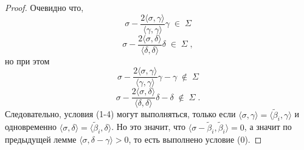\documentclass[10pt]{article}
\theoremstyle{remark}
\begin{document}
\begin{proof}
Очевидно что,
$$ \sigma - \frac{2 \langle \sigma,\gamma\rangle}{\langle \gamma , \gamma \rangle}\gamma \;\in\; \Sigma $$
$$ \sigma - \frac{2 \langle \sigma,\delta\rangle}{\langle \delta , \delta \rangle}\delta \;\in\; \Sigma \; , $$
но при этом
$$ \sigma - \frac{2 \langle \sigma,\gamma\rangle}{\langle \gamma , \gamma \rangle}\gamma-\gamma \;\notin\; \Sigma $$
$$ \sigma - \frac{2 \langle \sigma,\delta\rangle}{\langle \delta , \delta \rangle}\delta-\delta \;\notin\; \Sigma \; . $$
Следовательно, условия (1-4) могут выполняться, только если $\langle\sigma,\gamma\rangle=\langle\widetilde\beta_i,\gamma\rangle$
и одновременно $\langle\sigma,\delta\rangle=\langle\widetilde\beta_i,\delta\rangle$. Но это значит, что $\langle\sigma-\widetilde\beta_i,\widetilde\beta_i\rangle=0$,
а значит по предыдущей лемме $\langle\sigma,\delta-\gamma\rangle > 0$, то есть выполнено условие (0).
\end{proof}
\end{document}
